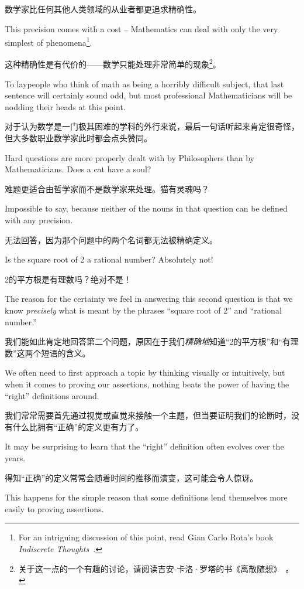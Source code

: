 数学家比任何其他人类领域的从业者都更追求精确性。

This precision
comes with a cost -- Mathematics can deal with only the very 
simplest of phenomena\footnote{For an intriguing discussion of this 
point, read Gian Carlo Rota's book {\em Indiscrete Thoughts}~\cite{rota}.}.

这种精确性是有代价的——数学只能处理非常简单的现象\footnote{关于这一点的一个有趣的讨论，请阅读吉安-卡洛·罗塔的书《离散随想》~\cite{rota}。}。

To laypeople who think of math as being
a horribly difficult subject, that last sentence will certainly 
sound odd, but most professional Mathematicians will be nodding 
their heads at this point.

对于认为数学是一门极其困难的学科的外行来说，最后一句话听起来肯定很奇怪，但大多数职业数学家此时都会点头赞同。

Hard questions are more properly dealt 
with by Philosophers than by Mathematicians.  Does a cat have 
a soul?

难题更适合由哲学家而不是数学家来处理。猫有灵魂吗？

Impossible
to say, because neither of the nouns in that question can be 
defined with any precision.

无法回答，因为那个问题中的两个名词都无法被精确定义。

Is the square root of 2 a rational number?
Absolutely not!

2的平方根是有理数吗？绝对不是！

The reason
for the certainty we feel in answering this second question is
that we know {\em precisely} what is meant by the phrases 
``square root of 2'' and ``rational number.''

我们能如此肯定地回答第二个问题，原因在于我们{\em 精确地}知道“2的平方根”和“有理数”这两个短语的含义。

We often need to first approach
a topic by thinking visually or intuitively, but when it comes to
proving our assertions, nothing beats the power of having the
``right'' definitions around.

我们常常需要首先通过视觉或直觉来接触一个主题，但当要证明我们的论断时，没有什么比拥有“正确”的定义更有力了。

It may be surprising to learn that
the ``right'' definition often evolves over the years.

得知“正确”的定义常常会随着时间的推移而演变，这可能会令人惊讶。

This 
happens for the simple reason that some definitions lend themselves
more easily to proving assertions.

